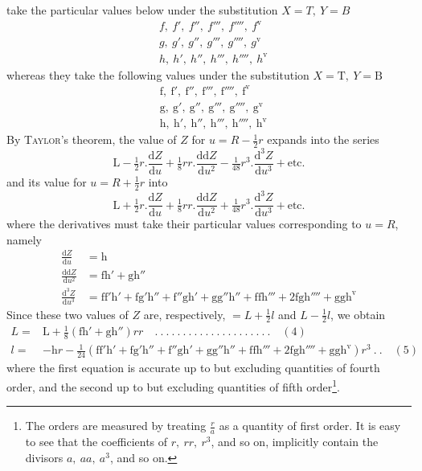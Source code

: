 %
take the particular values below under the substitution \(X=T,\ Y=B\)
\[
\begin{aligned}
&f,\ f',\ f'',\ f''',\ f'''',\ f^{\mathrm{v}}\\
&g,\ g',\ g'',\ g''',\ g'''',\ g^{\mathrm{v}}\\
&h,\ h',\ h'',\ h''',\ h'''',\ h^{\mathrm{v}}
\end{aligned}
\]
whereas they take the following values under the substitution \(X=\mathrm{T},\ Y=\mathrm{B}\)
\[
\begin{aligned}
&\mathrm{f},\ \mathrm{f}',\ \mathrm{f}'',\ \mathrm{f}''',\ \mathrm{f}'''',\ \mathrm{f}^{\mathrm{v}}\\
&\mathrm{g},\ \mathrm{g}',\ \mathrm{g}'',\ \mathrm{g}''',\ \mathrm{g}'''',\ \mathrm{g}^{\mathrm{v}}\\
&\mathrm{h},\ \mathrm{h}',\ \mathrm{h}'',\ \mathrm{h}''',\ \mathrm{h}'''',\ \mathrm{h}^{\mathrm{v}}
\end{aligned}
\]
By \textsc{Taylor}’s theorem, the value of \(Z\) for \(u=R-\frac12r\) expands into the series
\[
\mathrm{L}-\tfrac12r\mathord{.}\frac{\mathrm{d}Z}{\mathrm{d}u}+\tfrac18rr\mathord{.}\frac{\mathrm{dd}Z}{\mathrm{d}u^2}-\tfrac1{48}r^3\mathord{.}\frac{\mathrm{d}^3Z}{\mathrm{d}u^3}+\text{etc.}
\]
and its value for \(u=R+\frac12r\) into
\[
\mathrm{L}+\tfrac12r\mathord{.}\frac{\mathrm{d}Z}{\mathrm{d}u}+\tfrac18rr\mathord{.}\frac{\mathrm{dd}Z}{\mathrm{d}u^2}+\tfrac1{48}r^3\mathord{.}\frac{\mathrm{d}^3Z}{\mathrm{d}u^3}+\text{etc.}
\]
where the derivatives must take their particular values corresponding to \(u=R\), namely
\[
\begin{aligned}
\frac{\mathrm{d}Z}{\mathrm{d}u}&=\mathrm{h}\\
\frac{\mathrm{dd}Z}{\mathrm{d}u^2}&=\mathrm{fh}'+\mathrm{gh}''\\
\frac{\mathrm{d}^3Z}{\mathrm{d}u^3}&=\mathrm{ff'h}'+\mathrm{fg'h}''+\mathrm{f''gh}'+\mathrm{gg''h}''+\mathrm{ffh}'''+2\mathrm{fgh}''''+\mathrm{ggh}^{\mathrm{v}}
\end{aligned}
\]
Since these two values of \(Z\) are, respectively, \(=L+\frac12l\) and \(L-\frac12l\), we obtain
\begingroup\fontsize{10}{12}\selectfont
\[
\begin{aligned}
L={}&\mathrm{L}+\tfrac18(\mathrm{fh}'+\mathrm{gh}'')rr\quad .\ .\ .\ .\ .\ .\ .\ .\ .\ .\ .\ .\ .\ .\ .\ .\ .\ .\ .\ .\ .\quad(4)\\
l={}&-\mathrm{h}r-\tfrac1{24}(\mathrm{ff'h}'+\mathrm{fg'h}''+\mathrm{f''gh}'+\mathrm{gg''h}''+\mathrm{ffh}'''+2\mathrm{fgh}''''+\mathrm{ggh}^{\mathrm{v}})r^3\ .\ .\quad(5)
\end{aligned}
\]
\endgroup
where the first equation is accurate up to but excluding quantities of fourth order, and the second up to but excluding quantities of fifth order\footnote{The orders are measured by treating \(\frac ra\) as a quantity of first order. It is easy to see that the coefficients of \(r,\ rr,\ r^3\), and so on, implicitly contain the divisors \(a,\ aa,\ a^3\), and so on.}.
